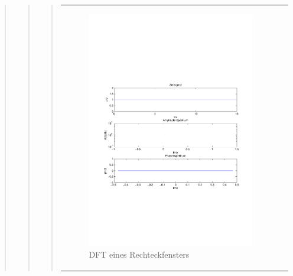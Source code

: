 \begin{quote}
\begin{quote}
\begin{quote}
                \begin{center}
                \begin{tabular}{ll}
    
                \hspace{-11em}
                    \begin{minipage}{0.6\textwidth}
    
                        \begin{figure}[H]
                            \label{fig:}
                            \includegraphics[scale=0.5, trim = 1.5cm 7cm 1.5cm 8cm, clip]{./Bilder/RechteckDFT}
                            \caption{DFT eines Rechteckfensters}
                        \end{figure}
    

\end{minipage}
\end{tabular}
\end{center}
\end{quote}
\end{quote}
\end{quote}
